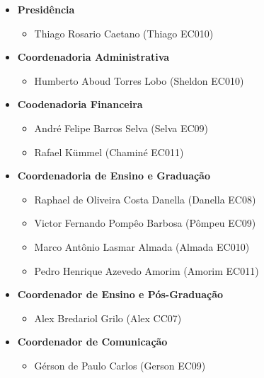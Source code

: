 \begin{itemize}
\item  \textbf{Presidência}
\begin{itemize}
\item Thiago Rosario Caetano (Thiago EC010)
\end{itemize}
\end{itemize}

\begin{itemize}
\item  \textbf{Coordenadoria Administrativa}
\begin{itemize}
\item Humberto Aboud Torres Lobo (Sheldon EC010) 
\end{itemize}
\end{itemize}

\begin{itemize}
\item  \textbf{Coodenadoria Financeira}
\begin{itemize}
\item  André Felipe Barros Selva (Selva EC09)
\item  Rafael Kümmel (Chaminé EC011)
\end{itemize}
\end{itemize}

\begin{itemize}
\item  \textbf{Coordenadoria de Ensino e Graduação}
\begin{itemize}
\item Raphael de Oliveira Costa Danella (Danella EC08)
\item Victor Fernando Pompêo Barbosa (Pômpeu EC09)
\item Marco Antônio Lasmar Almada (Almada EC010)
\item Pedro Henrique Azevedo Amorim (Amorim EC011)
\end{itemize}
\end{itemize}

\begin{itemize}
\item  \textbf{Coordenador de Ensino e Pós-Graduação}
\begin{itemize}
\item Alex Bredariol Grilo (Alex CC07)
\end{itemize}
\end{itemize}

\begin{itemize}
\item  \textbf{Coordenador de Comunicação}
\begin{itemize}
\item  Gérson de Paulo Carlos (Gerson EC09)
\end{itemize}
\end{itemize}

